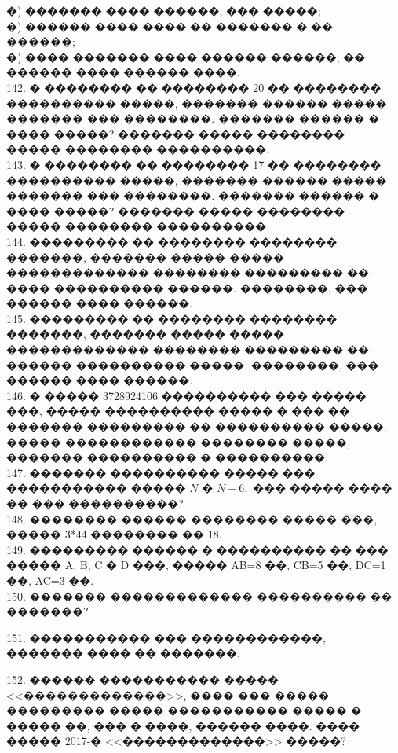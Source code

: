 \documentclass[12pt]{article}
\begin{document}
�) ������� ���� ������, ��� �����;\\
�) ������ ���� ���� �� ������� � �� ������;\\
�) ���� ������� ���� ������ ������, �� ������ ���� ������ ����.\\
142. � �������� �� �������� 20 �� �������� ���������� �����, ������� ������ ����� ������� ��� ��������. ������� ������ � ���� �����? ������� ����� �������� ����� �������� ����������.\\
143. � �������� �� �������� 17 �� �������� ���������� �����, ������� ������ ����� ������� ��� ��������. ������� ������ � ���� �����? ������� ����� �������� ����� �������� ����������.\\
144. ��������� �� �������� �������� �������, ������� ����� ����� ������������� �������� ��������� �� ���� ���������� ������. ��������, ��� ������ ���� ������.\\
145. ��������� �� �������� �������� �������, ������� ����� ����� ������������� �������� ��������� �� ������ ���������� �����. ��������, ��� ������ ���� ������.\\
146. � ����� 3728924106 ���������� ��� ����� ���, ����� ���������� ����� � ��� �� ������� ��������� �� ���������� �����. ����� ������������ �������� �����, ������� ���������� � ����������.\\
147. ������� ���������� ����� ��� ����������� ����� $N$ � $N+6,$ ��� ����� ���� �� ��� ����������?\\
148. �������� ������ �������� ����� ���, ����� 3*44 �������� �� 18.\\
149. ��������� ������ � ���������� �� ��� ����� A, B, C � D ���, ����� AB=8 ��, CB=5 ��, DC=1 ��, AC=3 ��.\\
150. ������� ������������� ���������� �� �������?
\begin{center}
\begin{figure}[ht!]
\end{figure}
\end{center}
151. ����������� ��� ������������, ������� ���� �� �������.
\begin{center}
\begin{figure}[ht!]
\end{figure}
\end{center}
152. ������ ����������� ����� <<�������������>>, ���� ��� ����� ��������� ����� ����������� ����� � ����� ��, ��� � ����, ������ ����. ���� ����� 2017-� <<�������������>> �����?\\
\end{document}
